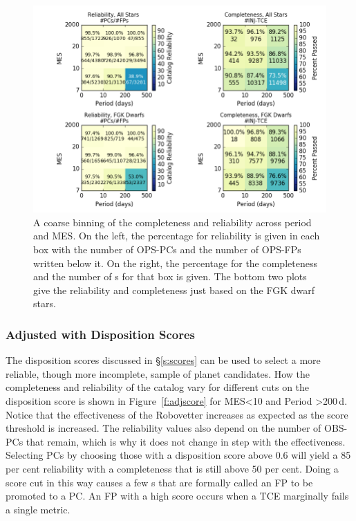 \begin{figure}[h!]
\begin{center}
\includegraphics[width=0.95\linewidth]{fig-completeReliabilityCard.png}
\caption{\label{f:score} A coarse binning of the completeness and reliability across period and MES. On the left, the percentage for reliability is given in each box with the number of OPS-PCs and the number of OPS-FPs written below it.  On the right, the percentage for the completeness and the number of \injtce s for that box is given. The bottom two plots give the reliability and completeness just based on the FGK dwarf stars. }
\end{center}
\end{figure}


\subsubsection{Adjusted with Disposition Scores}
\label{s:crscores}
The disposition scores discussed in \S\ref{s:scores} can be used to select a more reliable, though more incomplete, sample of planet candidates.  How the completeness and reliability of the catalog vary for different cuts on the disposition score is shown in Figure~\ref{f:adjscore} for MES<10 and Period >200\,d. Notice that the effectiveness of the Robovetter increases as expected as the score threshold is increased.  The reliability values also depend on the number of OBS-PCs that remain, which is why it does not change in step with the effectiveness.  Selecting PCs by choosing those with a disposition score above 0.6 will yield a 85 per cent reliability with a completeness that is still above 50 per cent. Doing a score cut in this way causes a few \opstce s that are formally called an FP to be promoted to a PC. An FP with a high score occurs when a TCE marginally fails a single metric.

